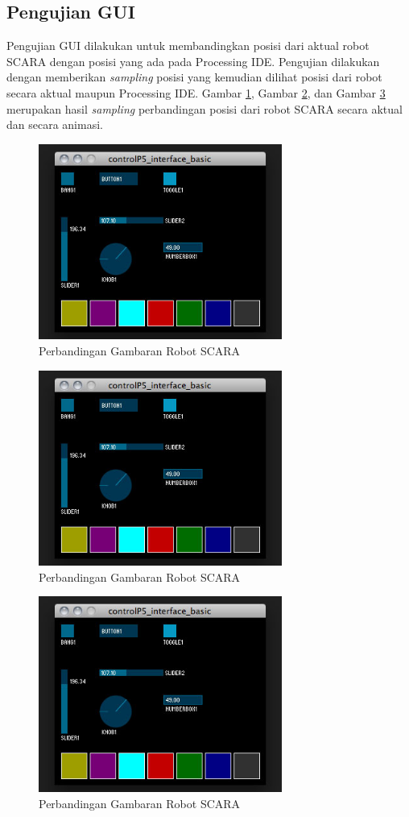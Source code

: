  \subsection{Pengujian GUI}
 Pengujian GUI dilakukan untuk membandingkan posisi dari aktual robot SCARA dengan posisi yang ada pada Processing IDE. Pengujian dilakukan dengan memberikan \textit{sampling} posisi yang kemudian dilihat posisi dari robot secara aktual maupun Processing IDE. Gambar \ref{pic.pengujiangui1}, Gambar \ref{pic.pengujiangui2}, dan Gambar \ref{pic.pengujiangui3} merupakan hasil \textit{sampling} perbandingan posisi dari robot SCARA secara aktual dan secara animasi.
  \begin{figure}[H]
 	\centering
 	\includegraphics[width=8cm]{gambar/controlp5.jpg}
 	\caption{Perbandingan Gambaran Robot SCARA}
 	\label{pic.pengujiangui1}
 \end{figure}
\begin{figure}[H]
	\centering
	\includegraphics[width=8cm]{gambar/controlp5.jpg}
	\caption{Perbandingan Gambaran Robot SCARA}
	\label{pic.pengujiangui2}
\end{figure}
\begin{figure}[H]
	\centering
	\includegraphics[width=8cm]{gambar/controlp5.jpg}
	\caption{Perbandingan Gambaran Robot SCARA}
	\label{pic.pengujiangui3}
\end{figure}
